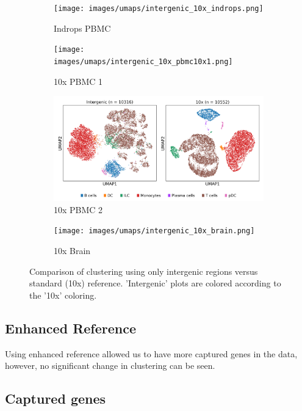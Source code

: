 \begin{figure}[htbp]
    \centering
    \begin{subfigure}{0.45\textwidth}
        \centering
        \texttt{[image: images/umaps/intergenic\_10x\_indrops.png]}
        \caption{Indrops PBMC}
    \end{subfigure}
    \hfill
    \begin{subfigure}{0.45\textwidth}
        \centering
        \texttt{[image: images/umaps/intergenic\_10x\_pbmc10x1.png]}
        \caption{10x PBMC 1}
    \end{subfigure}
    \vspace{0.5em}
    \begin{subfigure}{0.45\textwidth}
        \centering
        \includegraphics[width=\textwidth]{images/umaps/intergenic_10x_pbmc10x2.png}
        \caption{10x PBMC 2}
    \end{subfigure}
    \hfill
    \begin{subfigure}{0.45\textwidth}
        \centering
        \texttt{[image: images/umaps/intergenic\_10x\_brain.png]}
        \caption{10x Brain}
    \end{subfigure}
    \caption{Comparison of clustering using only intergenic regions versus standard (10x) reference.
    'Intergenic' plots are colored according to the '10x' coloring.}
    \label{fig:umapComparisonIntergenic}
\end{figure}

\subsection{Enhanced Reference}

Using enhanced reference allowed us to have more captured genes in the data,
however, no significant change in clustering can be seen.

\subsection{Captured genes}


